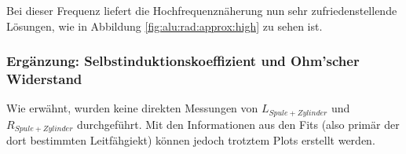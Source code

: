{	\begin{minipage}[t]{0.33\textwidth}
        \vspace{0mm}
        Bei    dieser    Frequenz     liefert    die    Hochfrequenzn\"aherung
        nun   sehr    zufriedenstellende   L\"osungen,   wie    in   Abbildung
        \ref{fig:alu:rad:approx:high} zu sehen ist.

        
	\end{minipage}%
	\begin{minipage}[t]{0.67\textwidth}
        \vspace{0mm}
        \resizebox{.95\textwidth}{!}{}
        \label{fig:alu:rad:approx:high}
	\end{minipage}

    \subsubsection{Erg\"anzung: Selbstinduktionskoeffizient und Ohm'scher Widerstand}
    \label{sec:ausw:subsec:vollz:subsubsec:LR}

	\begin{minipage}[t]{0.33\textwidth}
        \vspace{0mm}
        Wie  erw\"ahnt,  wurden  keine  direkten  Messungen  von  $L_{Spule  +
        Zylinder}$   und  $R_{Spule   +  Zylinder}$   durchgef\"uhrt. Mit  den
        Informationen  aus  den  Fits   (also  prim\"ar  der  dort  bestimmten
        Leitf\"ahgiekt) k\"onnen jedoch trotztem Plots erstellt werden.


\end{minipage}}
